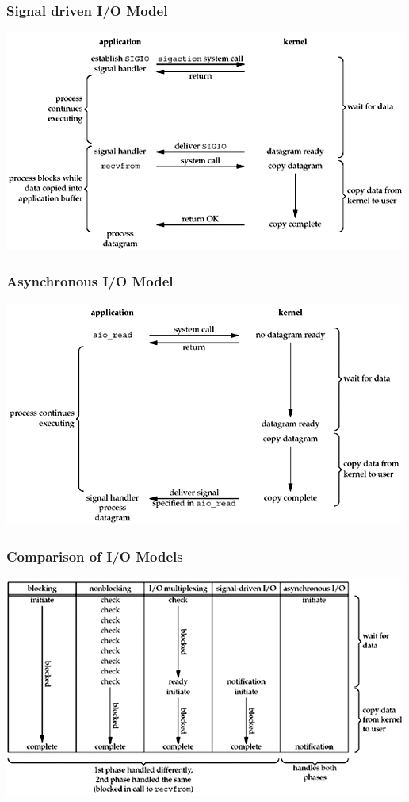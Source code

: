 \documentclass[notes,serif]{beamer}
\begin{document}
\begin{frame}
\frametitle{Signal driven I/O Model}
  \begin{center}
  \includegraphics[width=.9\textwidth]{figs/06fig04.png}
  \end{center}
\end{frame}

\begin{frame}
\frametitle{Asynchronous I/O Model}
  \begin{center}
  \includegraphics[width=.9\textwidth]{figs/06fig05.png}
  \end{center}
\end{frame}

\begin{frame}
\frametitle{Comparison of I/O Models}
  \begin{center}
  \includegraphics[width=.9\textwidth]{figs/06fig06.png}
  \end{center}
\end{frame}
\end{document}
